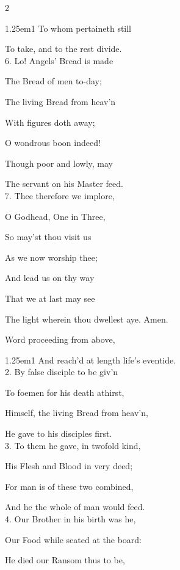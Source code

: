 \begin{paracol}{2}
\begin{hangparas}{1.25em}{1}
To whom pertaineth still

To take, and to the rest divide.\\

6. Lo! Angels' Bread is made

The Bread of men to-day;

The living Bread from heav’n

With figures doth away;

O wondrous boon indeed!

Though poor and lowly, may

The servant on his Master feed.\\

7. Thee therefore we implore,

O Godhead, One in Three,

So may'st thou visit us

As we now worship thee;

And lead us on thy way

That we at last may see

The light wherein thou dwellest aye. Amen.
\end{hangparas}

\switchcolumn

\mattinsOfficeHymn
{} Word proceeding from above,


\begin{hangparas}{1.25em}{1}
And reach'd at length life’s eventide.\\

2. By false disciple to be giv'n

To foemen for his death athirst,

Himself, the living Bread from heav'n,

He gave to his disciples first.\\

3. To them he gave, in twofold kind,

His Flesh and Blood in very deed;

For man is of these two combined,

And he the whole of man would feed.\\

4. Our Brother in his birth was he,

Our Food while seated at the board:

He died our Ransom thus to be,


\end{hangparas}
\end{paracol}
